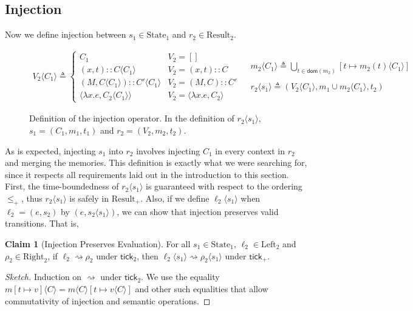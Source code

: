 \documentclass{article}
\theoremstyle{definition}
\newtheorem{clm}{Claim}[section]
\newcommand*{\cons}{::}
\newcommand*{\Left}{\text{Left}}
\newcommand*{\Right}{\text{Right}}
\newcommand*{\mem}{m}
\newcommand*{\State}{\text{State}}
\newcommand*{\Result}{\text{Result}}
\newcommand*{\semarrow}{\rightsquigarrow}
\newcommand*{\tick}{\mathsf{tick}}
\newcommand*{\inject}[2]{{#2}\langle{#1}\rangle}
\begin{document}
\subsection{Injection}
Now we define injection between $s_1\in\State_1$ and $r_2\in\Result_2$.
\begin{figure}[h!]
  \[
    \begin{array}{cc}
      \inject{C_{1}}{V_{2}}\triangleq
      \begin{cases}
        C_1                                           & V_{2}=[]                            \\
        (x, t)\cons\inject{C_{1}}{C}                  & V_{2}=(x,t)\cons C                  \\
        (M, \inject{C_{1}}{C})\cons\inject{C_{1}}{C'} & V_{2}=(M,C)\cons C'                 \\
        \langle\lambda x.e,\inject{C_1}{C_2}\rangle   & V_{2}=\langle\lambda x.e,C_2\rangle
      \end{cases} &
      \begin{array}{l}
        \inject{C_1}{\mem_2}\triangleq
        \displaystyle\bigcup_{t\in\mathsf{dom}(\mem_2)}[t\mapsto\inject{C_1}{\mem_2(t)}] \\ \\
        \inject{s_1}{r_2}\triangleq
        (\inject{C_1}{V_2},\mem_1\cup\inject{C_1}{\mem_2},t_2)
      \end{array}
    \end{array}
  \]
  \caption{Definition of the injection operator.
    In the definition of $\inject{s_1}{r_2}$, $s_1=(C_1,\mem_1,t_1)$ and $r_2=(V_2,\mem_2,t_2)$.}
  \label{fig:concinject}
\end{figure}

As is expected, injecting $s_1$ into $r_2$ involves injecting $C_1$ in every context in $r_2$ and merging the memories.
This definition is exactly what we were searching for, since it respects all requirements laid out in the introduction to this section.
First, the time-boundedness of $\inject{s_1}{r_2}$ is guaranteed with respect to the ordering $\le_+$, thus $\inject{s_1}{r_2}$ is safely in $\Result_+$.
Also, if we define $\inject{s_1}{\ell_2}$ when $\ell_2=(e,s_2)$ by $(e,\inject{s_1}{s_2})$, we can show that injection preserves valid transitions. That is,
\begin{clm}[Injection Preserves Evaluation]
  For all $s_1\in\State_1$, $\ell_2\in\Left_2$ and $\rho_2\in\Right_2$,
  if $\ell_2\semarrow\rho_2$ under $\tick_2$, then $\inject{s_1}{\ell_2}\semarrow\inject{s_1}{\rho_2}$ under $\tick_+$.
\end{clm}
\begin{proof}[Sketch]
  Induction on $\semarrow$ under $\tick_2$.
  We use the equality $\inject{C}{\mem[t\mapsto v]}=\inject{C}{\mem}[t\mapsto\inject{C}{v}]$ and other such equalities that allow commutativity of injection and semantic operations.
\end{proof}
\end{document}
